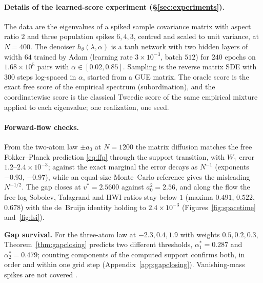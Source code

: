 \documentclass[11pt]{article}
\theoremstyle{plain}
\theoremstyle{definition}
\theoremstyle{remark}
\begin{document}
\paragraph{Details of the learned-score experiment (\S\ref{sec:experiments}).} The data are the
eigenvalues of a spiked sample covariance matrix with aspect ratio $2$ and three population spikes $6,4,3$, centred and
scaled to unit variance, at $N=400$. The denoiser $h_\theta(\lambda,\alpha)$ is a tanh network with two hidden layers of
width $64$ trained by Adam (learning rate $3\times10^{-3}$, batch $512$) for $240$ epochs on $1.68\times10^5$ pairs with
$\alpha\in[0.02,0.85]$. Sampling is the reverse matrix SDE with $300$ steps log-spaced in $\alpha$, started from a GUE matrix.
The oracle score is the exact free score of the empirical spectrum (subordination), and the coordinatewise score is the
classical Tweedie score of the same empirical mixture applied to each eigenvalue; one realization, one seed.

\paragraph{Forward-flow checks.} From the two-atom law $\pm a_0$ at
$N=1200$ the matrix diffusion matches the free Fokker--Planck prediction \eqref{eq:ffp}
through the support transition, with $W_1$ error $1.2$--$2.4\times10^{-3}$; against the
exact marginal the error decays as $N^{-1}$ (exponents $-0.93$, $-0.97$), while an
equal-size Monte~Carlo reference gives the misleading $N^{-1/2}$. The gap closes at
$v^*=2.5600$ against $a_0^2=2.56$, and along the flow the free log-Sobolev, Talagrand and
HWI ratios stay below $1$ (maxima $0.491$, $0.522$, $0.678$) with the de~Bruijn identity
holding to $2.4\times10^{-3}$ (Figures~\ref{fig:spacetime} and~\ref{fig:lsi}).

\textbf{Gap survival.} For the three-atom law at $-2.3,0.4,1.9$ with weights
$0.5,0.2,0.3$, Theorem~\ref{thm:gapclosing} predicts two different thresholds,
$\alpha_1^*=0.287$ and $\alpha_2^*=0.479$; counting components of the computed support
confirms both, in order and within one grid step (Appendix~\ref{app:gapclosing}).
Vanishing-mass spikes are not covered \citep{BaikBenArousPeche2005}.
\end{document}
